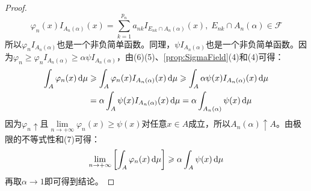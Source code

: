 \begin{proof}
	\begin{equation*}
		\varphi_n(x)I_{A_n(\alpha)}(x)=\sum_{k=1}^{p_n}a_{nk}I_{E_{nk}\cap A_n(\alpha)}(x),\;E_{nk}\cap A_n(\alpha)\in \mathscr{F}
	\end{equation*}
	所以$\varphi_nI_{A_n(\alpha)}$也是一个非负简单函数。同理，$\psi I_{A_n(\alpha)}$也是一个非负简单函数。因为$\varphi_n\geqslant\varphi_nI_{A_n(\alpha)}\geqslant\alpha\psi I_{A_n(\alpha)}$，由(6)(5)、\cref{prop:SigmaField}(4)和(4)可得：
	\begin{align*}
		\int_{A}^{}\varphi_n(x)\mathop{}\!\mathrm{d}\mu
		&\geqslant\int_{A}^{}\varphi_n(x)I_{A_n(\alpha)}(x)\mathop{}\!\mathrm{d}\mu\geqslant\int_{A}\alpha\psi(x)I_{A_n(\alpha)}(x)\mathop{}\!\mathrm{d}\mu \\
		&=\alpha\int_{A}^{}\psi(x)I_{A_n(\alpha)}(x)\mathop{}\!\mathrm{d}\mu=\alpha\int_{A_n(\alpha)}\psi(x)\mathop{}\!\mathrm{d}\mu
	\end{align*}
	因为$\varphi_n\uparrow$且$\lim\limits_{n\to+\infty}\varphi_n(x)\geqslant\psi(x)$对任意$x\in A$成立，所以$A_n(\alpha)\uparrow A$。由极限的不等式性和(7)可得：
	\begin{equation*}
		\lim_{n\to+\infty}\left[\int_{A}^{}\varphi_n(x)\mathop{}\!\mathrm{d}\mu\right]\geqslant\alpha\int_{A}^{}\psi(x)\mathop{}\!\mathrm{d}\mu
	\end{equation*}
	再取$\alpha\to 1$即可得到结论。
\end{proof}

